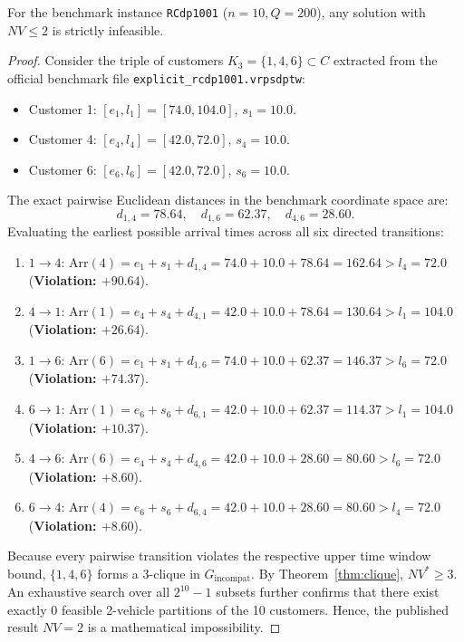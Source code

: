 \begin{theorem}
\label{thm:rcdp1001_infeasible}
For the benchmark instance \texttt{RCdp1001} ($n=10, Q=200$), any solution with $NV \le 2$ is strictly infeasible.
\end{theorem}
\begin{proof}
Consider the triple of customers $K_3 = \{1, 4, 6\} \subset C$ extracted from the official benchmark file \texttt{explicit\_rcdp1001.vrpsdptw}:
\begin{itemize}
    \item Customer 1: $[e_1, l_1] = [74.0, 104.0]$, $s_1 = 10.0$.
    \item Customer 4: $[e_4, l_4] = [42.0, 72.0]$, $s_4 = 10.0$.
    \item Customer 6: $[e_6, l_6] = [42.0, 72.0]$, $s_6 = 10.0$.
\end{itemize}
The exact pairwise Euclidean distances in the benchmark coordinate space are:
\begin{equation}
d_{1,4} = 78.64, \quad d_{1,6} = 62.37, \quad d_{4,6} = 28.60.
\end{equation}
Evaluating the earliest possible arrival times across all six directed transitions:
\begin{enumerate}
    \item $1 \to 4$: $\text{Arr}(4) = e_1 + s_1 + d_{1,4} = 74.0 + 10.0 + 78.64 = 162.64 > l_4 = 72.0$ (\textbf{Violation: $+90.64$}).
    \item $4 \to 1$: $\text{Arr}(1) = e_4 + s_4 + d_{4,1} = 42.0 + 10.0 + 78.64 = 130.64 > l_1 = 104.0$ (\textbf{Violation: $+26.64$}).
    \item $1 \to 6$: $\text{Arr}(6) = e_1 + s_1 + d_{1,6} = 74.0 + 10.0 + 62.37 = 146.37 > l_6 = 72.0$ (\textbf{Violation: $+74.37$}).
    \item $6 \to 1$: $\text{Arr}(1) = e_6 + s_6 + d_{6,1} = 42.0 + 10.0 + 62.37 = 114.37 > l_1 = 104.0$ (\textbf{Violation: $+10.37$}).
    \item $4 \to 6$: $\text{Arr}(6) = e_4 + s_4 + d_{4,6} = 42.0 + 10.0 + 28.60 = 80.60 > l_6 = 72.0$ (\textbf{Violation: $+8.60$}).
    \item $6 \to 4$: $\text{Arr}(4) = e_6 + s_6 + d_{6,4} = 42.0 + 10.0 + 28.60 = 80.60 > l_4 = 72.0$ (\textbf{Violation: $+8.60$}).
\end{enumerate}
Because every pairwise transition violates the respective upper time window bound, $\{1, 4, 6\}$ forms a 3-clique in $G_{\text{incompat}}$. By Theorem~\ref{thm:clique}, $NV^* \ge 3$. An exhaustive search over all $2^{10} - 1$ subsets further confirms that there exist exactly $0$ feasible 2-vehicle partitions of the 10 customers. Hence, the published result $NV = 2$ is a mathematical impossibility.
\end{proof}

